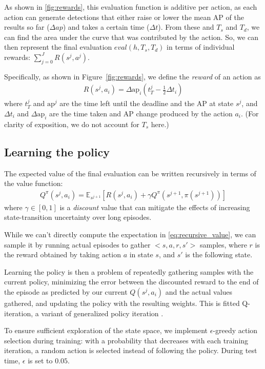 As shown in \autoref{fig:rewards}, this evaluation function is additive per action, as each action can generate detections that either raise or lower the mean AP of the results so far ($\Delta ap$) and takes a certain time ($\Delta t$).
From these and $T_s$ and $T_d$, we can find the area under the curve that was contributed by the action.
So, we can then represent the final evaluation $eval(h,T_s,T_d)$ in terms of individual rewards: $\sum_{j=0}^J R(s^j,a^j)$.

Specifically, as shown in Figure~\ref{fig:rewards}, we define the \emph{reward} of an action as
\begin{align}\label{eq:advanced}
R(s^j,a_i) = \Delta \text{ap}_i (t_T^j-\frac{1}{2}\Delta t_i)
\end{align}
where $t_T^j$ and $\text{ap}^j$ are the time left until the deadline and the AP at state $s^j$, and $\Delta t_i$ and $\Delta \text{ap}_i$ are the time taken and AP change produced by the action $a_i$.
(For clarity of exposition, we do not account for $T_s$ here.)

\subsection{Learning the policy}
The expected value of the final evaluation can be written recursively in terms of the value function:
\begin{align} \label{eq:recursive_value}
Q^\pi(s^j,a_i) = \mathbb{E}_{s^{j+1}} [R(s^j,a_i) + \gamma Q^\pi(s^{j+1},\pi(s^{j+1}))]
\end{align}
where $\gamma \in [0,1]$ is a \emph{discount} value that can mitigate the effects of increasing state-transition uncertainty over long episodes.

While we can't directly compute the expectation in \eqref{eq:recursive_value}, we can sample it by running actual episodes to gather $<s,a,r,s'>$ samples, where $r$ is the reward obtained by taking action $a$ in state $s$, and $s'$ is the following state.

Learning the policy is then a problem of repeatedly gathering samples with the current policy, minimizing the error between the discounted reward to the end of the episode as predicted by our current $Q(s^j,a_i)$ and the actual values gathered, and updating the policy with the resulting weights.
This is fitted Q-iteration, a variant of generalized policy iteration \cite{Ernst2005,Sutton1998}.

To ensure sufficient exploration of the state space, we implement $\epsilon$-greedy action selection during training: with a probability that decreases with each training iteration, a random action is selected instead of following the policy.
During test time, $\epsilon$ is set to $0.05$.

